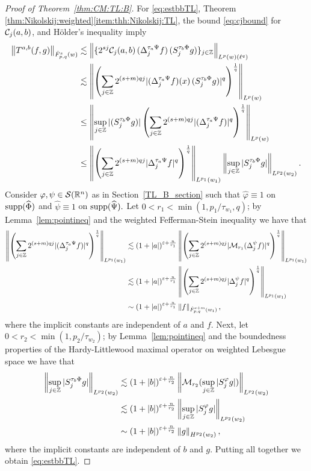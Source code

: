 \begin{proof}[Proof of Theorem~\ref{thm:CM:TL:B}]
For \eqref{eq:estbbTL},
Theorem \ref{thm:Nikolskij:weighted}\eqref{item:thh:Nikolskij:TL}, the bound \eqref{eq:cjbound} for $\mathcal{C}_j(a,b)$, and H\"older's inequality  imply
\begin{align*}
\left\|T^{a,b}(f,g)\right\|_{\dot{F}^s_{p,q}(w)} & \lesssim \left\|\{2^{sj} \mathcal{C}_j(a,b) \,(\Delta^{ \tau_a \Psi }_{j} f ) \, (S^{ \tau_b \Phi }_{j} g)\}_{j\in\mathbb{Z}} \right\|_{L^p(w)(\ell^q)}\\
& \lesssim \left\|\left(\sum\limits_{j \in \mathbb{Z}}  2^{(s +m) q j}  |(\Delta^{ \tau_a \Psi }_{j} f )(x) \, (S^{ \tau_b \Phi }_{j} g)|^q   \right)^\frac{1}{q}\right\|_{L^p(w)}\\
& \le\left\|\sup\limits_{j \in \mathbb{Z}} |(S^{ \tau_b \Phi }_{j} g)| \left(\sum\limits_{j \in \mathbb{Z}}  2^{(s +m) q j}  |(\Delta^{ \tau_a \Psi }_{j} f )|^q   \right)^\frac{1}{q}\right\|_{L^p(w)}\\
& \le \left\|\left(\sum_{j \in \mathbb{Z}}  2^{(s +m) q j}  |\Delta^{ \tau_a \Psi }_{j} f |^q   \right)^\frac{1}{q}\right\|_{L^{p_1}(w_1)} \left\|\sup\limits_{j \in \mathbb{Z}} |S^{ \tau_b \Phi }_{j} g|\right\|_{L^{p_2}(w_2)}.
\end{align*}
Consider $\varphi,\psi\in{\mathcal{S}}({{\mathbb R}^n})$ as in Section~\ref{TL_B_section} such that   $\widehat{\varphi}\equiv 1$ on ${\rm{supp}}(\widehat{\Phi})$ and  $\widehat{\psi}\equiv 1$ on ${\rm{supp}}(\widehat{\Psi}).$  Let   $0<r_1<\min(1, p_1/\tau_{w_1},q)$; by Lemma~\ref{lem:pointineq} and the weighted Fefferman-Stein inequality  we have that  
\begin{align*}
\left\|\left(\sum_{j \in \mathbb{Z}}  2^{(s +m) q j}  |(\Delta^{ \tau_a \Psi }_{j} f )|^q   \right)^\frac{1}{q}\right\|_{L^{p_1}(w_1)}&\lesssim (1+\left\vert a \right\vert)^{\varepsilon+\frac{n}{r_1}}
\left\|\left(\sum_{j \in \mathbb{Z}}  2^{(s +m) q j}  |\mathcal{M}_{r_1}(\Delta^{\psi }_{j} f) |^q   \right)^\frac{1}{q}\right\|_{L^{p_1}(w_1)}\\
&\lesssim (1+\left\vert a \right\vert)^{\varepsilon+\frac{n}{r_1}} \left\|\left(\sum_{j \in \mathbb{Z}}  2^{(s +m) q j}  |\Delta^{\psi }_{j} f|^q   \right)^\frac{1}{q}\right\|_{L^{p_1}(w_1)}\\
&\sim (1+\left\vert a \right\vert)^{\varepsilon+\frac{n}{r_1}}  \left\|f\right\|_{\dot{F}^{s+m}_{p,q}(w_1)},
\end{align*}
where the implicit constants are independent of $a$ and $f.$ Next, let  $0<r_2<\min(1,p_2/\tau_{w_2})$; by Lemma~\ref{lem:pointineq} and the boundedness properties of the Hardy-Littlewood maximal operator on weighted Lebesgue space  we have that  
\begin{align*}
\left\|\sup_{j\in\mathbb{Z}}|S^{\tau_b\Phi}_{j}g|\right\|_{L^{p_2}(w_2)}&\lesssim (1+\left\vert b \right\vert)^{\varepsilon+\frac{n}{r_2}} \left\|\mathcal{M}_{r_2}(\sup_{j\in\mathbb{Z}}|S^{\varphi}_{j}g|)\right\|_{L^{p_2}(w_2)}\\
&\lesssim (1+\left\vert b \right\vert)^{\varepsilon+\frac{n}{r_2}} \left\|\sup_{j\in\mathbb{Z}}|S^{\varphi}_{j}g|\right\|_{L^{p_2}(w_2)}\\
&\sim (1+\left\vert b \right\vert)^{\varepsilon+\frac{n}{r_2}} \left\|g\right\|_{H^{p_2}(w_2)},
\end{align*}
where the implicit constants are independent of $b$ and $g.$ Putting all together we obtain \eqref{eq:estbbTL}.



\end{proof}
